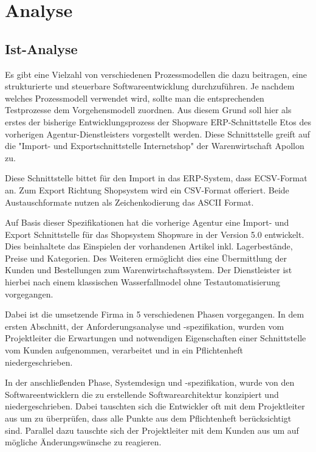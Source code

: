 \newpage
\section{Analyse}

\subsection{Ist-Analyse}
Es gibt eine Vielzahl von verschiedenen Prozessmodellen die dazu beitragen, eine strukturierte und steuerbare Softwareentwicklung durchzuführen. Je nachdem welches Prozessmodell verwendet wird,
sollte man die entsprechenden Testprozesse dem Vorgehensmodell zuordnen. Aus diesem Grund soll hier als erstes der bisherige Entwicklungsprozess der  Shopware ERP-Schnittstelle Etos des vorherigen Agentur-Dienstleisters vorgestellt werden. Diese Schnittstelle greift auf die "Import- und Exportschnittstelle Internetshop" der Warenwirtschaft Apollon zu. 

Diese Schnittstelle bittet für den Import in das ERP-System, dass ECSV-Format an. Zum Export Richtung Shopsystem wird ein CSV-Format offeriert. Beide Austauschformate nutzen als Zeichenkodierung das ASCII Format.

Auf Basis dieser Spezifikationen hat die vorherige Agentur eine Import- und Export Schnittstelle für das Shopsystem Shopware in der Version 5.0 entwickelt. Dies beinhaltete das Einspielen der vorhandenen Artikel inkl. Lagerbestände, Preise und Kategorien. Des Weiteren ermöglicht dies eine Übermittlung der Kunden und Bestellungen zum Warenwirtschaftssystem. Der Dienstleister ist hierbei nach einem klassischen Wasserfallmodel ohne Testautomatisierung vorgegangen. 

Dabei ist die umsetzende Firma in 5 verschiedenen Phasen vorgegangen. In dem ersten Abschnitt, der Anforderungsanalyse und -spezifikation, wurden vom Projektleiter die Erwartungen und notwendigen Eigenschaften einer Schnittstelle vom Kunden aufgenommen, verarbeitet und in ein Pflichtenheft niedergeschrieben.

In der anschließenden Phase, Systemdesign und -spezifikation, wurde von den Softwareentwicklern die zu erstellende Softwarearchitektur konzipiert und niedergeschrieben. Dabei tauschten sich die Entwickler oft mit dem Projektleiter aus um zu überprüfen, dass alle Punkte aus dem Pflichtenheft berücksichtigt sind. Parallel dazu tauschte sich der Projektleiter mit dem Kunden aus um auf mögliche Änderungswünsche zu reagieren.

